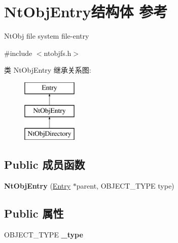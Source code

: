 \hypertarget{struct_nt_obj_entry}{}\section{Nt\+Obj\+Entry结构体 参考}
\label{struct_nt_obj_entry}


Nt\+Obj file system file-\/entry  




{\ttfamily \#include $<$ntobjfs.\+h$>$}

类 Nt\+Obj\+Entry 继承关系图\+:\begin{figure}[H]
\begin{center}
\leavevmode
\includegraphics[height=3.000000cm]{struct_nt_obj_entry}
\end{center}
\end{figure}
\subsection*{Public 成员函数}
\begin{DoxyCompactItemize}
\item 
\mbox{\label{struct_nt_obj_entry_ac122177a1fe156e44da8f43bde0dc2ea}} 
{\bfseries Nt\+Obj\+Entry} (\hyperlink{struct_entry}{Entry} $\ast$parent, O\+B\+J\+E\+C\+T\+\_\+\+T\+Y\+PE type)
\end{DoxyCompactItemize}
\subsection*{Public 属性}
\begin{DoxyCompactItemize}
\item 
\mbox{\label{struct_nt_obj_entry_a8bf09e553fb632bb739d2e2c4bd2a3e1}} 
O\+B\+J\+E\+C\+T\+\_\+\+T\+Y\+PE {\bfseries \+\_\+type}
\end{DoxyCompactItemize}
